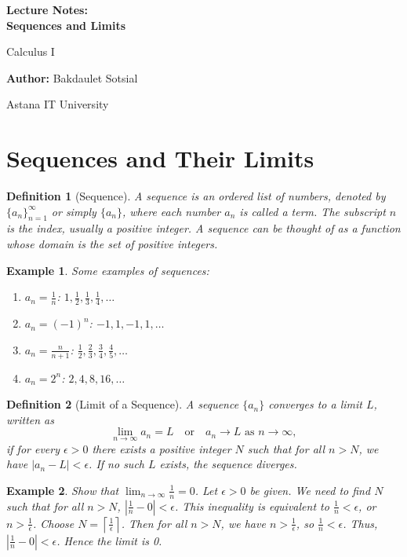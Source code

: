 \documentclass[11pt,a4paper]{article}
\newtheorem{example}{Example}
\newtheorem{definition}{Definition}
\begin{document}
\begin{titlepage}
\centering
\vspace*{4cm}
{\Huge\bfseries Lecture Notes:\\ Sequences and Limits\par}
\vspace{1cm}
{\Large Calculus I\par}
\vspace{2cm}
{\large \textbf{Author:} Bakdaulet Sotsial\par}
\vspace{1cm}
\vfill
{\small Astana IT University \par}
\vspace*{2cm}
\end{titlepage}
\tableofcontents
\newpage
\section{Sequences and Their Limits}
\begin{definition}[Sequence]
A \textit{sequence} is an ordered list of numbers, denoted by $\{a_n\}_{n=1}^{\infty}$ or simply $\{a_n\}$, where each number $a_n$ is called a \textit{term}. The subscript $n$ is the index, usually a positive integer. A sequence can be thought of as a function whose domain is the set of positive integers.
\end{definition}
\begin{example}
Some examples of sequences:
\begin{enumerate}
\item $a_n = \frac{1}{n}$: $1, \frac{1}{2}, \frac{1}{3}, \frac{1}{4}, \dots$
\item $a_n = (-1)^n$: $-1, 1, -1, 1, \dots$
\item $a_n = \frac{n}{n+1}$: $\frac{1}{2}, \frac{2}{3}, \frac{3}{4}, \frac{4}{5}, \dots$
\item $a_n = 2^n$: $2, 4, 8, 16, \dots$
\end{enumerate}
\end{example}
\begin{definition}[Limit of a Sequence]
A sequence $\{a_n\}$ \textit{converges} to a limit $L$, written as
\[
\lim_{n \to \infty} a_n = L \quad \text{or} \quad a_n \to L \text{ as } n \to \infty,
\]
if for every $\epsilon > 0$ there exists a positive integer $N$ such that for all $n > N$, we have $|a_n - L| < \epsilon$. If no such $L$ exists, the sequence \textit{diverges}.
\end{definition}
\begin{example}
Show that $\displaystyle \lim_{n \to \infty} \frac{1}{n} = 0$.
Let $\epsilon > 0$ be given. We need to find $N$ such that for all $n > N$, $\left|\frac{1}{n} - 0\right| < \epsilon$. This inequality is equivalent to $\frac{1}{n} < \epsilon$, or $n > \frac{1}{\epsilon}$. Choose $N = \left\lceil \frac{1}{\epsilon} \right\rceil$. Then for all $n > N$, we have $n > \frac{1}{\epsilon}$, so $\frac{1}{n} < \epsilon$. Thus, $\left|\frac{1}{n} - 0\right| < \epsilon$. Hence the limit is 0.
\end{example}
\end{document}
